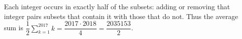 Each integer occurs in exactly half of the subsets: adding or removing that integer pairs subsets that contain it with those that do not. Thus the average sum is $\dfrac{1}{2}\sum_{k=1}^{2017}k=\dfrac{2017\cdot2018}{4}=\boxed{\dfrac{2035153}{2}}$.
